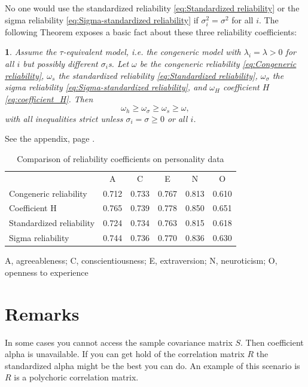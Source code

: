 \documentclass{article}
\makeatletter
\theoremstyle{plain}
\theoremstyle{plain}
\theoremstyle{definition}
\theoremstyle{remark}
\theoremstyle{definition}
\theoremstyle{plain}
\theoremstyle{plain}
\newtheorem{prop}[thm]{\protect\propositionname}
\theoremstyle{definition}
\newenvironment{proof}[1][\protect\proofname]{\par
	\normalfont\topsep6\p@\@plus6\p@\relax
	\trivlist
	\itemindent\parindent
	\item[\hskip\labelsep\scshape #1]\ignorespaces
}{%
	\endtrivlist\@endpefalse
}
\providecommand{\proofname}{Proof}
\providecommand{\propositionname}{Proposition}
\makeatother
\begin{document}
No one would use the standardized reliability \ref{eq:Standardized reliability}
or the sigma reliability \eqref{eq:Sigma-standardized reliability}
if $\sigma_{i}^{2}=\sigma^{2}$ for all $i$. The following Theorem
exposes a basic fact about these three reliability coefficients:
\begin{prop}
\label{prop:Properties of three} Assume the $\tau$-equivalent model,
i.e. the congeneric model with $\lambda_{i}=\lambda>0$ for all $i$
but possibly different $\sigma_{i}$s. Let $\omega$ be the congeneric
reliability \eqref{eq:Congeneric reliability}, $\omega_{s}$ the standardized reliability \eqref{eq:Standardized reliability},
$\omega_{\sigma}$ the sigma reliability \eqref{eq:Sigma-standardized reliability},
and $\omega_{H}$ coefficient $H$ \eqref{eq:coefficient_H}. Then
\[
\omega_{h}\geq\omega_{\sigma}\geq\omega_{s}\geq\omega,
\]
with all inequalities strict unless $\sigma_{i}=\sigma\geq0$ or all
$i$.
\end{prop}
\begin{proof}
See the appendix, page \pageref{proof:Properties}.
\end{proof}

\begin{table}[ht]
\centering
\caption{Comparison of reliability coefficients on personality data} 
\label{tab:reliabilites}
\begin{tabular}{lccccc}
  & A & C & E & N & O \\ 
 Congeneric reliability & 0.712 & 0.733 & 0.767 & 0.813 & 0.610 \\ 
  Coefficient H & 0.765 & 0.739 & 0.778 & 0.850 & 0.651 \\ 
  Standardized reliability & 0.724 & 0.734 & 0.763 & 0.815 & 0.618 \\ 
  Sigma reliability & 0.744 & 0.736 & 0.770 & 0.836 & 0.630 \\ 
  \end{tabular}
  \vskip7.0pt
A, agreeableness; C, conscientiousness; E, extraversion; N, neuroticism; O, openness to experience
\end{table}

\section{Remarks}
In some cases you cannot access the sample covariance matrix $S$. Then coefficient alpha is unavailable. If you can get hold of the correlation matrix $R$ the standardized alpha might be the best you can do. An example of this scenario is $R$ is a polychoric correlation matrix.
\end{document}
